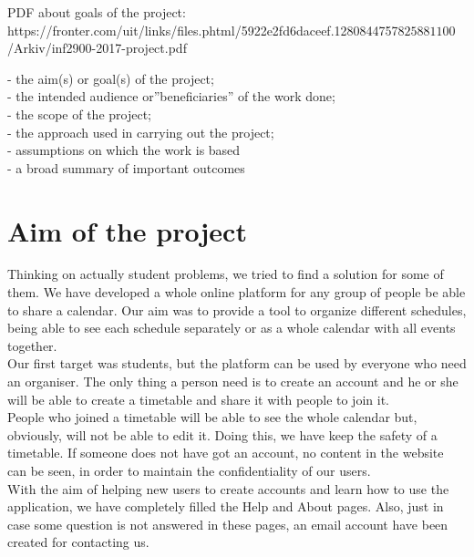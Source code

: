 

PDF about goals of the project: \\
https://fronter.com/uit/links/files.phtml/5922e2fd6daceef.1280844757$825881100$/Arkiv/inf2900-2017-project.pdf

- the aim(s) or goal(s) of the project;\\
- the intended audience or''beneficiaries'' of the work done;\\
- the scope of the project;\\
- the approach used in carrying out the project;\\
- assumptions on which the work is based\\
- a broad summary of important outcomes

\section{Aim of the project}

Thinking on actually student problems, we tried to find a solution for some of them. We have developed a whole  online platform for any group of people be able to share a calendar. Our aim was to provide a tool to organize  different schedules, being able to see each schedule separately or as a whole calendar with all events together.\\
Our first target was students, but the platform can be used by everyone who need an organiser. The only thing a person need is to create an account and he or she will be able to create a timetable and share it with people to join it.\\
People who joined a timetable will be able to see the whole calendar but, obviously, will not be able to edit it. Doing this, we have keep the safety of a timetable. If someone does not have got an account, no content in the website can be seen, in order to maintain the confidentiality of our users.\\
With the aim of helping new users to create accounts and learn how to use the application, we have completely filled the Help and About pages. Also, just in case some question is not answered in these pages, an email account have been created for contacting us.\\

